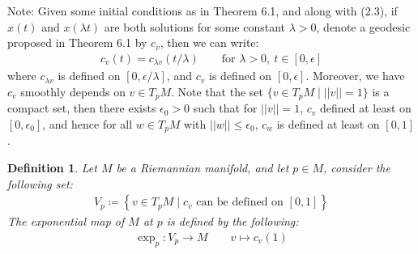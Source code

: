 \documentclass[11pt]{book}
\theoremstyle{break}
\theoremstyle{break}
\newtheorem{defn}{Definition}[corL]
\newcommand{\note}{\color{red}Note: \color{black}}
\begin{document}
\note Given some initial conditions as in Theorem 6.1, and along with (2.3), if $x(t)$ and $x(\lambda t)$ are both solutions for some constant $\lambda>0$, denote a geodesic proposed in Theorem 6.1 by $c_v$, then we can write:
\begin{align*}
c_v(t) = c_{\lambda v}\left( t/\lambda\right) \qquad \text{for }\lambda>0,\ t\in [0,\epsilon]
\end{align*}
where $c_{\lambda v}$ is defined on $[0,\epsilon/\lambda]$, and $c_v$ is defined on $[0,\epsilon]$. Moreover, we have $c_v$ smoothly depends on $v \in T_pM$. Note that the set $\{v \in T_pM\mid ||v|| = 1\}$ is a compact set, then there exists $\epsilon_0 >0$ such that for $||v|| = 1$, $c_v$ defined at least on $[0,\epsilon_0]$, and hence for all $w \in T_pM$ with $||w||\leq \epsilon_0$, $c_w $ is defined at least on $[0,1]$. 



\begin{defn}
Let $M$ be a Riemannian manifold, and let $p \in M$, consider the following set:
\begin{align*}
V_p \coloneqq \left\{ v \in T_pM \mid c_v \text{ can be defined on }[0,1]\right\}
\end{align*}
The exponential map of $M$ at $p$ is defined by the following:
\begin{align*}
\exp_p:V_p \to M \qquad v\mapsto c_v(1)
\end{align*}
\end{defn}
\end{document}
